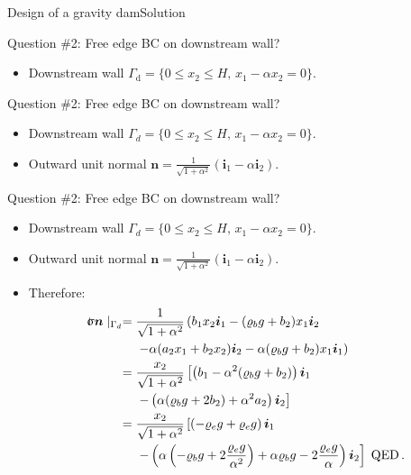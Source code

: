\documentclass{beamer}
\newcommand{\xj}{x}
\renewcommand{\ij}{i}
\newcommand{\iv}{{\boldsymbol\ij}}
\newcommand{\nj}{n}
\newcommand{\nv}{{\boldsymbol\nj}}
\newcommand{\roi}{\varrho}
\newcommand{\stress}{\mbox{$\hspace{0.3em}\rotatebox[x=0pt,y=0.2pt]{90}{\rule{0.017\linewidth}{0.4pt}}\hspace{-0.25em}\upsigma$}}
\begin{document}
\begin{frame}{Design of a gravity dam}{Solution}

\begin{overprint}

\vskip-20pt
\begin{exampleblock}{Question \#2: Free edge BC on downstream wall?}
\begin{itemize}
\item Downstream wall $\Gamma_\text{d}=\{0\leq\xj_2\leq H,\,\xj_1-\alpha\xj_2=0\}$.
\end{itemize}
\end{exampleblock}

\vskip-20pt
\begin{exampleblock}{Question \#2: Free edge BC on downstream wall?}
\begin{itemize}
\item Downstream wall $\Gamma_d=\{0\leq\xj_2\leq H,\,\xj_1-\alpha\xj_2=0\}$.
\item Outward unit normal $\nv=\frac{1}{\sqrt{1+\alpha^2}}(\iv_1-\alpha\iv_2)$.
\end{itemize}
\end{exampleblock}

\vskip-20pt
\begin{exampleblock}{Question \#2: Free edge BC on downstream wall?}
\begin{itemize}
\item Downstream wall $\Gamma_d=\{0\leq\xj_2\leq H,\,\xj_1-\alpha\xj_2=0\}$.
\item Outward unit normal $\nv=\frac{1}{\sqrt{1+\alpha^2}}(\iv_1-\alpha\iv_2)$.
\item Therefore:
\begin{displaymath}
\begin{split}
\stress\nv\mid_{\Gamma_d}= &\;\frac{1}{\sqrt{1+\alpha^2}}\left(b_1\xj_2\iv_1-(\roi_b g+b_2)\xj_1\iv_2\right. \\
&\;\left. -\alpha(a_2\xj_1+b_2\xj_2)\iv_2-\alpha(\roi_b g+b_2)\xj_1\iv_1\right) \\
= &\;\frac{\xj_2}{\sqrt{1+\alpha^2}}\left[\left(b_1-\alpha^2(\roi_b g+b_2)\right)\iv_1 \right. \\
&\;\left. -\left(\alpha(\roi_b g+2b_2)+\alpha^2a_2\right)\iv_2\right] \\
= &\;\frac{\xj_2}{\sqrt{1+\alpha^2}}\left[\left(-\roi_e g+\roi_e g\right)\iv_1 \right. \\
&\;\left. -\left(\alpha\left(-\roi_b g+2\frac{\roi_e g}{\alpha^2}\right) +\alpha\roi_b g-2 \frac{\roi_e g}{\alpha}\right)\iv_2\right]\;\text{QED}\,.
\end{split}
\end{displaymath}
\end{itemize}
\end{exampleblock}

\end{overprint}

\end{frame}
\end{document}
